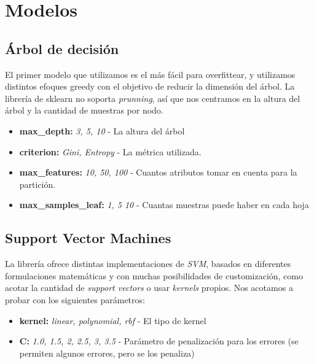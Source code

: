 \section{Modelos}

\subsection{Árbol de decisión}
El primer modelo que utilizamos es el más fácil para overfittear, y utilizamos distintos efoques greedy con el objetivo de
reducir la dimensión del árbol. La librería de sklearn no soporta \textit{prunning}, así que nos centramos en la altura del árbol
y la cantidad de muestras por nodo.
\begin{itemize}
\item \textbf{max\_depth:} \textit{3, 5, 10} - La altura del árbol
\item \textbf{criterion:} \textit{Gini, Entropy} - La métrica utilizada.
\item \textbf{max\_features:} \textit{10, 50, 100} - Cuantos atributos tomar en cuenta para la partición.
\item \textbf{max\_samples\_leaf:} \textit{1, 5 10} - Cuantas muestras puede haber en cada hoja
\end{itemize}


\subsection{Support Vector Machines}
La librería ofrece distintas implementaciones de \textit{SVM}, basados en diferentes formulaciones matemáticas y con muchas posibilidades de customización, como acotar la cantidad de \textit{support vectors} o usar \textit{kernels} propios. Nos acotamos a probar con los siguientes parámetros:
\begin{itemize}
\item \textbf{kernel:} \textit{linear, polynomial, rbf} - El tipo de kernel
\item \textbf{C:} \textit{1.0, 1.5, 2, 2.5, 3, 3.5} - Parámetro de penalización para los errores (se permiten algunos errores, pero se los penaliza)
\end{itemize}

